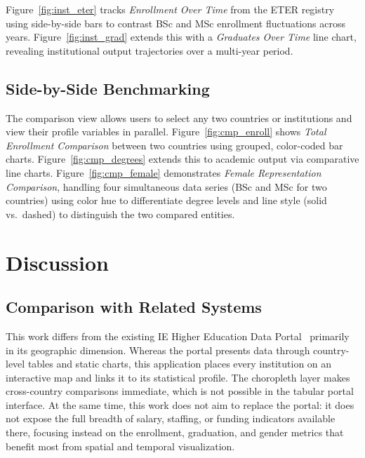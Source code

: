 \documentclass[final,3p,times,twocolumn]{elsarticle}
\begin{document}
Figure~\ref{fig:inst_eter} tracks \textit{Enrollment Over Time} from the ETER registry using side-by-side bars to contrast BSc and MSc enrollment fluctuations across years. Figure~\ref{fig:inst_grad} extends this with a \textit{Graduates Over Time} line chart, revealing institutional output trajectories over a multi-year period.

\subsection{Side-by-Side Benchmarking}

The comparison view allows users to select any two countries or institutions and view their profile variables in parallel. Figure~\ref{fig:cmp_enroll} shows \textit{Total Enrollment Comparison} between two countries using grouped, color-coded bar charts. Figure~\ref{fig:cmp_degrees} extends this to academic output via comparative line charts. Figure~\ref{fig:cmp_female} demonstrates \textit{Female Representation Comparison}, handling four simultaneous data series (BSc and MSc for two countries) using color hue to differentiate degree levels and line style (solid vs.\ dashed) to distinguish the two compared entities.

\section{Discussion}
\label{sec:discussion}

\subsection{Comparison with Related Systems}

This work differs from the existing IE Higher Education Data Portal~\cite{IEPortal2023} primarily in its geographic dimension. Whereas the portal presents data through country-level tables and static charts, this application places every institution on an interactive map and links it to its statistical profile. The choropleth layer makes cross-country comparisons immediate, which is not possible in the tabular portal interface. At the same time, this work does not aim to replace the portal: it does not expose the full breadth of salary, staffing, or funding indicators available there, focusing instead on the enrollment, graduation, and gender metrics that benefit most from spatial and temporal visualization.
\end{document}

